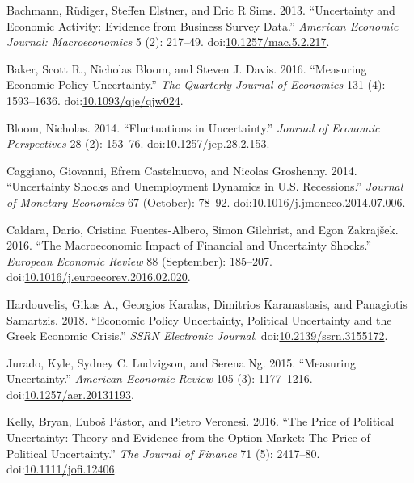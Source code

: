 \documentclass[11pt,preprint, authoryear]{elsarticle}
\numberwithin{equation}{section}
\numberwithin{figure}{section}
\numberwithin{table}{section}
\begin{document}
\hypertarget{ref-Bachmann2013}{}
Bachmann, Rüdiger, Steffen Elstner, and Eric R Sims. 2013. ``Uncertainty
and Economic Activity: Evidence from Business Survey Data.''
\emph{American Economic Journal: Macroeconomics} 5 (2): 217--49.
doi:\href{https://doi.org/10.1257/mac.5.2.217}{10.1257/mac.5.2.217}.

\hypertarget{ref-Baker2016}{}
Baker, Scott R., Nicholas Bloom, and Steven J. Davis. 2016. ``Measuring
Economic Policy Uncertainty.'' \emph{The Quarterly Journal of Economics}
131 (4): 1593--1636.
doi:\href{https://doi.org/10.1093/qje/qjw024}{10.1093/qje/qjw024}.

\hypertarget{ref-Bloom2014}{}
Bloom, Nicholas. 2014. ``Fluctuations in Uncertainty.'' \emph{Journal of
Economic Perspectives} 28 (2): 153--76.
doi:\href{https://doi.org/10.1257/jep.28.2.153}{10.1257/jep.28.2.153}.

\hypertarget{ref-Caggiano2014}{}
Caggiano, Giovanni, Efrem Castelnuovo, and Nicolas Groshenny. 2014.
``Uncertainty Shocks and Unemployment Dynamics in U.S. Recessions.''
\emph{Journal of Monetary Economics} 67 (October): 78--92.
doi:\href{https://doi.org/10.1016/j.jmoneco.2014.07.006}{10.1016/j.jmoneco.2014.07.006}.

\hypertarget{ref-Caldara2016}{}
Caldara, Dario, Cristina Fuentes-Albero, Simon Gilchrist, and Egon
Zakrajšek. 2016. ``The Macroeconomic Impact of Financial and Uncertainty
Shocks.'' \emph{European Economic Review} 88 (September): 185--207.
doi:\href{https://doi.org/10.1016/j.euroecorev.2016.02.020}{10.1016/j.euroecorev.2016.02.020}.

\hypertarget{ref-Hardouvelis2018}{}
Hardouvelis, Gikas A., Georgios Karalas, Dimitrios Karanastasis, and
Panagiotis Samartzis. 2018. ``Economic Policy Uncertainty, Political
Uncertainty and the Greek Economic Crisis.'' \emph{SSRN Electronic
Journal}.
doi:\href{https://doi.org/10.2139/ssrn.3155172}{10.2139/ssrn.3155172}.

\hypertarget{ref-Jurado2015}{}
Jurado, Kyle, Sydney C. Ludvigson, and Serena Ng. 2015. ``Measuring
Uncertainty.'' \emph{American Economic Review} 105 (3): 1177--1216.
doi:\href{https://doi.org/10.1257/aer.20131193}{10.1257/aer.20131193}.

\hypertarget{ref-Kelly2016}{}
Kelly, Bryan, Ľuboš Pástor, and Pietro Veronesi. 2016. ``The Price of
Political Uncertainty: Theory and Evidence from the Option Market: The
Price of Political Uncertainty.'' \emph{The Journal of Finance} 71 (5):
2417--80.
doi:\href{https://doi.org/10.1111/jofi.12406}{10.1111/jofi.12406}.
\end{document}
